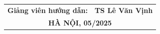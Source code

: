 \documentclass[BTL.tex]{subfiles}
\begin{document}
\begin{titlepage}
\begin{center}
\begin{table}[H]
\begin{tabular}{ll}
\multicolumn{1}{c}{\textbf{\large{Giảng viên hướng dẫn:}}} & {\textbf{\large{TS Lê Văn Vịnh}}} \hspace{0.5cm} \\[2cm]
\multicolumn{2}{c}{\textbf{\large{HÀ NỘI, 05/2025}}}                                            
\end{tabular}%

\end{table}
\end{center}



\end{titlepage}
\end{document}
